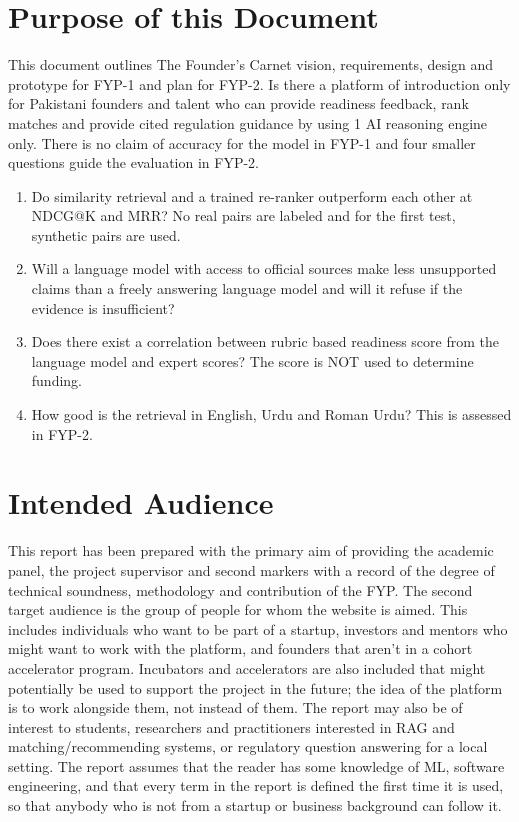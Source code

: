 \documentclass{FastFyp}
\begin{document}
\section{Purpose of this Document}
This document outlines The Founder's Carnet vision, requirements, design and prototype for FYP-1 and plan for FYP-2. Is there a platform of introduction only for Pakistani founders and talent who can provide readiness feedback, rank matches and provide cited regulation guidance by using 1 AI reasoning engine only. There is no claim of accuracy for the model in FYP-1 and four smaller questions guide the evaluation in FYP-2.
\begin{enumerate}
    \item Do similarity retrieval and a trained re-ranker outperform each other at NDCG@K and MRR? No real pairs are labeled and for the first test, synthetic pairs are used.
    \item Will a language model with access to official sources make less unsupported claims than a freely answering language model and will it refuse if the evidence is insufficient?
    \item Does there exist a correlation between rubric based readiness score from the language model and expert scores? The score is NOT used to determine funding.
    \item How good is the retrieval in English, Urdu and Roman Urdu? This is assessed in FYP-2.
\end{enumerate}

\section{Intended Audience}
This report has been prepared with the primary aim of providing the academic panel, the project supervisor and second markers with a record of the degree of technical soundness, methodology and contribution of the FYP. The second target audience is the group of people for whom the website is aimed. This includes individuals who want to be part of a startup, investors and mentors who might want to work with the platform, and founders that aren't in a cohort accelerator program. Incubators and accelerators are also included that might potentially be used to support the project in the future; the idea of the platform is to work alongside them, not instead of them. The report may also be of interest to students, researchers and practitioners interested in RAG and matching/recommending systems, or regulatory question answering for a local setting. The report assumes that the reader has some knowledge of ML, software engineering, and that every term in the report is defined the first time it is used, so that anybody who is not from a startup or business background can follow it.
\end{document}
